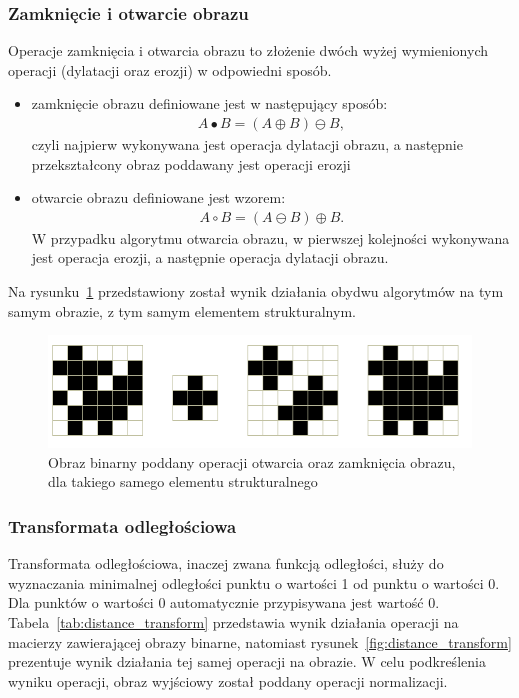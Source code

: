 \subsubsection{Zamknięcie i otwarcie obrazu}
Operacje zamknięcia i otwarcia obrazu to złożenie dwóch wyżej wymienionych operacji (dylatacji oraz erozji) w odpowiedni sposób.
\begin{itemize}
\item zamknięcie obrazu definiowane jest w następujący sposób:
  \begin{gather*}
    A \bullet B = (A \oplus B) \ominus B,
  \end{gather*} 
czyli najpierw wykonywana jest operacja dylatacji obrazu, a następnie przekształcony obraz poddawany jest operacji erozji
\item otwarcie obrazu definiowane jest wzorem:
  \begin{gather*}
    A \circ B = (A \ominus B) \oplus B.
  \end{gather*}
W przypadku algorytmu otwarcia obrazu, w pierwszej kolejności wykonywana jest operacja erozji, a następnie operacja dylatacji obrazu.
\end{itemize}
Na rysunku~\ref{fig:open_close} przedstawiony został wynik działania obydwu algorytmów na tym samym obrazie, z tym samym elementem strukturalnym.
\begin{figure}
  \centering
  \includegraphics[width=15cm]{img/open-close}
  \caption{Obraz binarny poddany operacji otwarcia oraz zamknięcia obrazu, dla takiego samego elementu strukturalnego}
  \label{fig:open_close}
\end{figure}
\subsubsection{Transformata odległościowa}
Transformata odległościowa, inaczej zwana funkcją odległości, służy do wyznaczania minimalnej odległości punktu o wartości 1 od punktu o wartości 0. Dla punktów o wartości 0 automatycznie przypisywana jest wartość 0. \\
Tabela~\ref{tab:distance_transform} przedstawia wynik działania operacji na macierzy zawierającej obrazy binarne, natomiast rysunek~\ref{fig:distance_transform} prezentuje wynik działania tej samej operacji na obrazie. W celu podkreślenia wyniku operacji, obraz wyjściowy został poddany operacji normalizacji.

